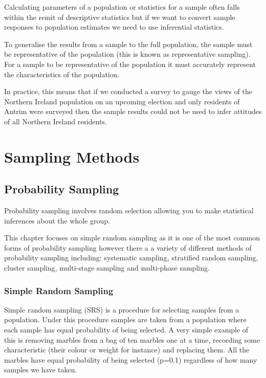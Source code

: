 \documentclass[
]{book}
\begin{document}
Calculating parameters of a population or statistics for a sample often falls within the remit of descriptive statistics but if we want to convert sample responses to population estimates we need to use inferential statistics.

To generalise the results from a sample to the full population, the sample must be representative of the population (this is known as representative sampling). For a sample to be representative of the population it must accurately represent the characteristics of the population.

In practice, this means that if we conducted a survey to gauge the views of the Northern Ireland population on an upcoming election and only residents of Antrim were surveyed then the sample results could not be used to infer attitudes of all Northern Ireland residents.

\hypertarget{sampling-methods}{%
\section{Sampling Methods}\label{sampling-methods}}

\hypertarget{probability-sampling}{%
\subsection{Probability Sampling}\label{probability-sampling}}

Probability sampling involves random selection allowing you to make statistical inferences about the whole group.

This chapter focuses on simple random sampling as it is one of the most common forms of probability sampling however there a a variety of different methods of probability sampling including: systematic sampling, stratified random sampling, cluster sampling, multi-stage sampling and multi-phase sampling.

\hypertarget{simple-random-sampling}{%
\subsubsection{Simple Random Sampling}\label{simple-random-sampling}}

Simple random sampling (SRS) is a procedure for selecting samples from a population. Under this procedure samples are taken from a population where each sample has equal probability of being selected. A very simple example of this is removing marbles from a bag of ten marbles one at a time, recording some characteristic (their colour or weight for instance) and replacing them. All the marbles have equal probability of being selected (p=0.1) regardless of how many samples we have taken.
\end{document}
